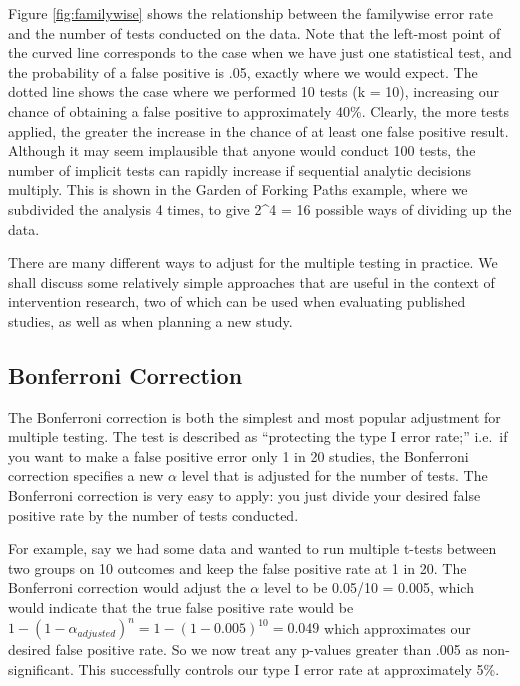 \documentclass{krantz}
\begin{document}
Figure \ref{fig:familywise} shows the relationship between the familywise error rate and the number of tests conducted on the data. Note that the left-most point of the curved line corresponds to the case when we have just one statistical test, and the probability of a false positive is .05, exactly where we would expect. The dotted line shows the case where we performed 10 tests (k = 10), increasing our chance of obtaining a false positive to approximately 40\%. Clearly, the more tests applied, the greater the increase in the chance of at least one false positive result. Although it may seem implausible that anyone would conduct 100 tests, the number of implicit tests can rapidly increase if sequential analytic decisions multiply. This is shown in the Garden of Forking Paths example, where we subdivided the analysis 4 times, to give 2\^{}4 = 16 possible ways of dividing up the data.

There are many different ways to adjust for the multiple testing in practice. We shall discuss some relatively simple approaches that are useful in the context of intervention research, two of which can be used when evaluating published studies, as well as when planning a new study.

\hypertarget{bonferroni-correction}{%
\subsection{Bonferroni Correction}\label{bonferroni-correction}}

The Bonferroni correction is both the simplest and most popular adjustment for multiple testing. The test is described as ``protecting the type I error rate;'' i.e.~if you want to make a false positive error only 1 in 20 studies, the Bonferroni correction specifies a new \(\alpha\) level that is adjusted for the number of tests. The Bonferroni correction is very easy to apply: you just divide your desired false positive rate by the number of tests conducted.

For example, say we had some data and wanted to run multiple t-tests between two groups on 10 outcomes and keep the false positive rate at 1 in 20. The Bonferroni correction would adjust the \(\alpha\) level to be 0.05/10 = 0.005, which would indicate that the true false positive rate would be \(1-(1-\alpha_{adjusted})^{n} = 1-(1-0.005)^{10} = 0.049\) which approximates our desired false positive rate. So we now treat any p-values greater than .005 as non-significant. This successfully controls our type I error rate at approximately 5\%.
\end{document}
